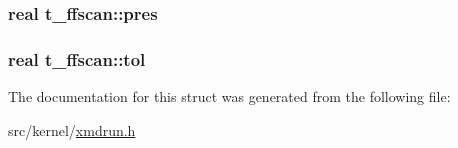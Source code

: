 \hypertarget{structt__ffscan_a5a645b900d4e48d62bb2d621d2feba0b}{
\subsubsection[{pres}]{\setlength{\rightskip}{0pt plus 5cm}real {\bf t\-\_\-ffscan\-::pres}}}\label{structt__ffscan_a5a645b900d4e48d62bb2d621d2feba0b}
\hypertarget{structt__ffscan_a7e63dc2b200c3dae417040b64b80a8a3}{
\subsubsection[{tol}]{\setlength{\rightskip}{0pt plus 5cm}real {\bf t\-\_\-ffscan\-::tol}}}\label{structt__ffscan_a7e63dc2b200c3dae417040b64b80a8a3}


\-The documentation for this struct was generated from the following file\-:\begin{DoxyCompactItemize}
\item 
src/kernel/\hyperlink{xmdrun_8h}{xmdrun.\-h}\end{DoxyCompactItemize}
